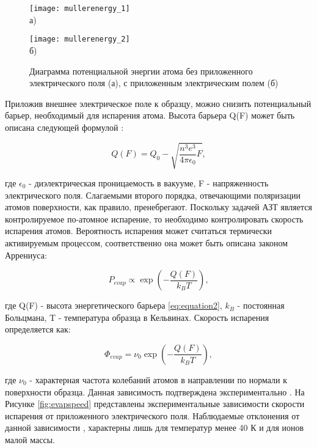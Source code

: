 \begin{figure}[ht]
	\begin{minipage}[b][][b]{0.49\textwidth}\centering
		\texttt{[image: mullerenergy\_1]} \\ а)
	\end{minipage}
	\begin{minipage}[b][][b]{0.49\textwidth}\centering
		\texttt{[image: mullerenergy\_2]} \\ б)
	\end{minipage}
	\caption{Диаграмма потенциальной энергии атома \cite{Vurpillot16} без приложенного электрического поля (а), с приложенным электрическим полем (б)}
	\label{fig:mulener}
\end{figure}

Приложив внешнее электрическое поле к образцу, можно снизить потенциальный барьер, необходимый для испарения атома. Высота барьера Q(F) может быть описана следующей формулой \cite{Muller56}:

\begin{equation}
	\label{eq:equation2}
	Q(F) = Q_0 - \sqrt{\frac{n^3 e^3}{4\pi\epsilon_0}F},
\end{equation}

где $\epsilon_0$ - диэлектрическая проницаемость в вакууме, F - напряженность электрического поля. Слагаемыми второго порядка, отвечающими поляризации атомов поверхности, как правило, пренебрегают. Поскольку задачей АЗТ является контролируемое по-атомное испарение, то необходимо контролировать скорость испарения атомов. Вероятность испарения может считаться термически активируемым процессом, соответственно она может быть описана законом Аррениуса:

\begin{equation}
	\label{eq:equation3}
	P_{evap} \propto \exp(-\frac{Q(F)}{k_B T}),
\end{equation}

где Q(F) - высота энергетического барьера \cref{eq:equation2}, $k_B$ - постоянная Больцмана, T - температура образца в Кельвинах. Скорость испарения определяется как:

\begin{equation}
	\label{eq:equation4}
	\Phi_{evap} = \nu_0\exp(-\frac{Q(F)}{k_B T}),
\end{equation}

где $\nu_0$ - характерная частота колебаний атомов в направлении по нормали к поверхности образца. Данная зависимость подтверждена экспериментально \cite{Kellogg81,Kellogg84}. На Рисунке \cref{fig:evapspeed} представлены экспериментальные зависимости скорости испарения от приложенного электрического поля. Наблюдаемые отклонения от данной зависимости \cite{Gomer84,Wada84}, характерны лишь для температур менее 40 К и для ионов малой массы.

